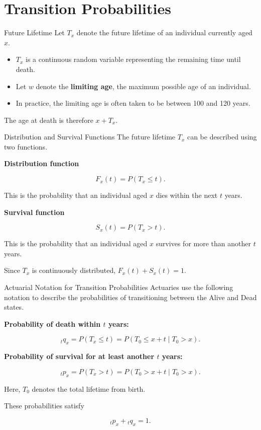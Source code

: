 \documentclass[
  ignorenonframetext,
  aspectratio=169,
]{beamer}
\providecommand{\tightlist}{%
  \setlength{\itemsep}{0pt}\setlength{\parskip}{0pt}}
\begin{document}
\section{Transition Probabilities}\label{transition-probabilities}

\begin{frame}{Future Lifetime}
\protect{}\label{future-lifetime}
Let \(T_x\) denote the future lifetime of an individual currently aged
\(x\).

\begin{itemize}
\tightlist
\item
  \(T_x\) is a continuous random variable representing the remaining
  time until death.
\item
  Let \(w\) denote the \textbf{limiting age}, the maximum possible age
  of an individual.
\item
  In practice, the limiting age is often taken to be between 100 and 120
  years.
\end{itemize}

The age at death is therefore \(x+T_x\).
\end{frame}

\begin{frame}{Distribution and Survival Functions}
\protect{}\label{distribution-and-survival-functions}
The future lifetime \(T_x\) can be described using two functions.

\textbf{Distribution function}

\[
F_x(t)=P(T_x\leq t).
\]

This is the probability that an individual aged \(x\) dies within the
next \(t\) years.

\textbf{Survival function}

\[
S_x(t)=P(T_x>t).
\]

This is the probability that an individual aged \(x\) survives for more
than another \(t\) years.

Since \(T_x\) is continuously distributed, \(F_x(t)+S_x(t)=1.\)
\end{frame}

\begin{frame}{Actuarial Notation for Transition Probabilities}
\protect{}\label{actuarial-notation-for-transition-probabilities}
Actuaries use the following notation to describe the probabilities of
transitioning between the Alive and Dead states.

\textbf{Probability of death within \(t\) years:}

\[
{}_tq_x
= P(T_x\leq t)
= P(T_0\leq x+t\mid T_0>x).
\]

\textbf{Probability of survival for at least another \(t\) years:}

\[
{}_tp_x
= P(T_x>t)
= P(T_0>x+t\mid T_0>x).
\]

Here, \(T_0\) denotes the total lifetime from birth.

These probabilities satisfy

\[
{}_tp_x+{}_tq_x=1.
\]
\end{frame}
\end{document}
